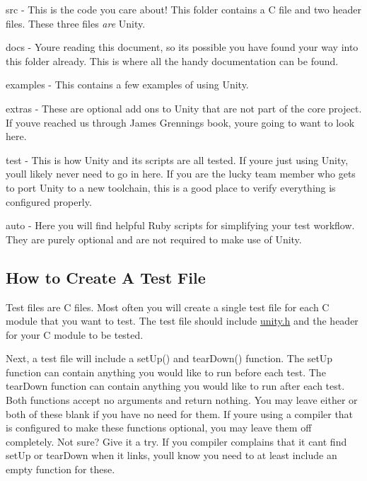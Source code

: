 \begin{DoxyItemize}
\item {\ttfamily src} -\/ This is the code you care about! This folder contains a C file and two header files. These three files {\itshape are} Unity.
\item {\ttfamily docs} -\/ You\textquotesingle{}re reading this document, so it\textquotesingle{}s possible you have found your way into this folder already. This is where all the handy documentation can be found.
\item {\ttfamily examples} -\/ This contains a few examples of using Unity.
\item {\ttfamily extras} -\/ These are optional add ons to Unity that are not part of the core project. If you\textquotesingle{}ve reached us through James Grenning\textquotesingle{}s book, you\textquotesingle{}re going to want to look here.
\item {\ttfamily test} -\/ This is how Unity and its scripts are all tested. If you\textquotesingle{}re just using Unity, you\textquotesingle{}ll likely never need to go in here. If you are the lucky team member who gets to port Unity to a new toolchain, this is a good place to verify everything is configured properly.
\item {\ttfamily auto} -\/ Here you will find helpful Ruby scripts for simplifying your test workflow. They are purely optional and are not required to make use of Unity.
\end{DoxyItemize}

\subsection*{How to Create A Test File}

Test files are C files. Most often you will create a single test file for each C module that you want to test. The test file should include \hyperlink{unity_8h_source}{unity.\+h} and the header for your C module to be tested.

Next, a test file will include a {\ttfamily set\+Up()} and {\ttfamily tear\+Down()} function. The set\+Up function can contain anything you would like to run before each test. The tear\+Down function can contain anything you would like to run after each test. Both functions accept no arguments and return nothing. You may leave either or both of these blank if you have no need for them. If you\textquotesingle{}re using a compiler that is configured to make these functions optional, you may leave them off completely. Not sure? Give it a try. If you compiler complains that it can\textquotesingle{}t find set\+Up or tear\+Down when it links, you\textquotesingle{}ll know you need to at least include an empty function for these.

